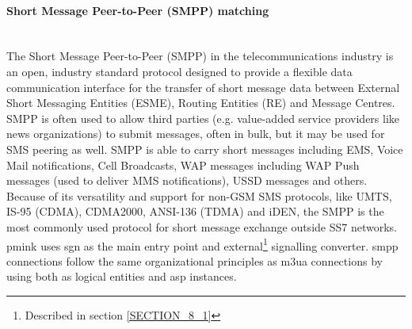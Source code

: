 \documentclass[a4paper,latin]{paper}
\begin{document}
\paragraph{Short Message Peer-to-Peer (SMPP) matching}
\mbox{}\\
The Short Message Peer-to-Peer (SMPP) in the telecommunications industry is an open, industry standard protocol designed to provide a flexible data communication interface 
for the transfer of short message data between External Short Messaging Entities (ESME), Routing Entities (RE) and Message Centres.\\

SMPP is often used to allow third parties (e.g. value-added service providers like news organizations) to submit messages, often in bulk, but it may be used for SMS peering as well. 
SMPP is able to carry short messages including EMS, Voice Mail notifications, Cell Broadcasts, WAP messages including WAP Push messages (used to deliver MMS notifications), USSD 
messages and others. Because of its versatility and support for non-GSM SMS protocols, like UMTS, IS-95 (CDMA), CDMA2000, ANSI-136 (TDMA) and iDEN, the SMPP is the most commonly 
used protocol for short message exchange outside SS7 networks.\\

\acrfull{pmink} uses \acrfull{sgn} as the main entry point and external\footnote{Described in section \ref{SECTION_8_1}} signalling converter. \acrfull{smpp} connections follow the
same organizational principles as \acrfull{m3ua} connections by using both \acrfull{as} logical entities and \acrfull{asp} instances.\\
\end{document}
